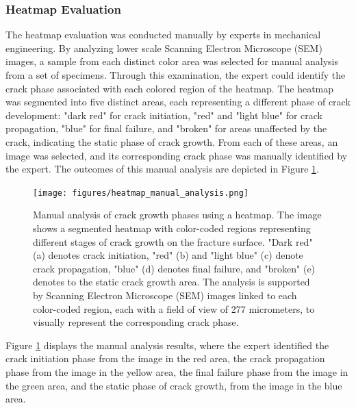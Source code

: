 \documentclass[preprint,12pt]{elsarticle}
\begin{document}
\begin{itemize}
\subsubsection{Heatmap Evaluation}
The heatmap evaluation was conducted manually by experts in mechanical engineering.
By analyzing lower scale Scanning Electron Microscope (SEM) images, a sample from each distinct color area was selected for manual analysis from a set of specimens. Through this examination, the expert could identify the crack phase associated with each colored region of the heatmap.
The heatmap was segmented into five distinct areas, each representing a different phase of crack development: "dark red" for crack initiation, "red" and "light blue" for crack propagation, "blue" for final failure, and "broken" for areas unaffected by the crack, indicating the static phase of crack growth. From each of these areas, an image was selected, and its corresponding crack phase was manually identified by the expert. The outcomes of this manual analysis are depicted in Figure \ref{fig:heatmap_manual_analysis}.


\begin{figure}[ht!]
\centering
\texttt{[image: figures/heatmap\_manual\_analysis.png]}
\caption{Manual analysis of crack growth phases using a heatmap. The image shows a segmented heatmap with color-coded regions representing different stages of crack growth on the fracture surface. "Dark red" (a) denotes crack initiation, "red" (b) and "light blue" (c) denote crack propagation, "blue" (d) denotes final failure, and "broken" (e) denotes to the static crack growth area. The analysis is supported by Scanning Electron Microscope (SEM) images linked to each color-coded region, each with a field of view of 277 micrometers, to visually represent the corresponding crack phase.}
\label{fig:heatmap_manual_analysis}
\end{figure}

Figure \ref{fig:heatmap_manual_analysis} displays the manual analysis results,
where the expert identified the crack initiation phase from the image in the red area,
the crack propagation phase from the image in the yellow area,
the final failure phase from the image in the green area, and the static phase of crack growth,
from the image in the blue area.


\end{itemize}
\end{document}
